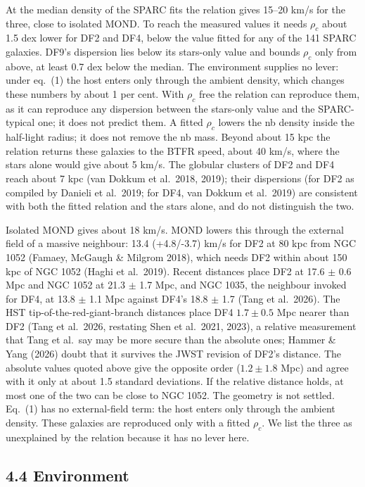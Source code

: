 \documentclass[
  10pt,
]{article}
\begin{document}
At the median density of the SPARC fits the relation gives 15--20 km/s for the three, close to isolated MOND. To reach the measured values it needs $\rho_c$ about 1.5 dex lower for DF2 and DF4, below the value fitted for any of the 141 SPARC galaxies. DF9's dispersion lies below its stars-only value and bounds $\rho_c$ only from above, at least 0.7 dex below the median. The environment supplies no lever: under eq.~(1) the host enters only through the ambient density, which changes these numbers by about 1 per cent. With $\rho_c$ free the relation can reproduce them, as it can reproduce any dispersion between the stars-only value and the SPARC-typical one; it does not predict them. A fitted $\rho_c$ lowers the nb density inside the half-light radius; it does not remove the nb mass. Beyond about 15 kpc the relation returns these galaxies to the BTFR speed, about 40 km/s, where the stars alone would give about 5 km/s. The globular clusters of DF2 and DF4 reach about 7 kpc (van Dokkum et al.~2018, 2019); their dispersions (for DF2 as compiled by Danieli et al.~2019; for DF4, van Dokkum et al.~2019) are consistent with both the fitted relation and the stars alone, and do not distinguish the two.

Isolated MOND gives about 18 km/s. MOND lowers this through the external field of a massive neighbour: 13.4 (+4.8/-3.7) km/s for DF2 at 80 kpc from NGC 1052 (Famaey, McGaugh \& Milgrom 2018), which needs DF2 within about 150 kpc of NGC 1052 (Haghi et al.~2019). Recent distances place DF2 at 17.6 $\pm$ 0.6 Mpc and NGC 1052 at 21.3 $\pm$ 1.7 Mpc, and NGC 1035, the neighbour invoked for DF4, at 13.8 $\pm$ 1.1 Mpc against DF4's 18.8 $\pm$ 1.7 (Tang et al.~2026). The HST tip-of-the-red-giant-branch distances place DF4 $1.7\pm0.5$ Mpc nearer than DF2 (Tang et al.~2026, restating Shen et al.~2021, 2023), a relative measurement that Tang et al.\ say may be more secure than the absolute ones; Hammer \& Yang (2026) doubt that it survives the JWST revision of DF2's distance. The absolute values quoted above give the opposite order ($1.2\pm1.8$ Mpc) and agree with it only at about 1.5 standard deviations. If the relative distance holds, at most one of the two can be close to NGC 1052. The geometry is not settled. Eq.~(1) has no external-field term: the host enters only through the ambient density. These galaxies are reproduced only with a fitted $\rho_c$. We list the three as unexplained by the relation because it has no lever here.


\subsection{4.4 Environment}
\end{document}

